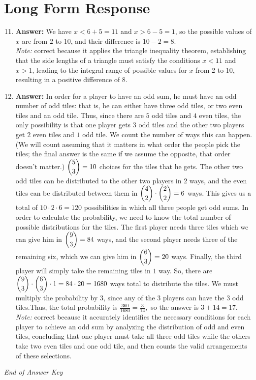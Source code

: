 \documentclass[12pt]{article}
\begin{document}
\section*{Long Form Response}
\begin{enumerate}[label=\arabic*.]
\setcounter{enumi}{10}
\item \textbf{Answer:} We have $x<6+5=11$ and $x>6-5=1$, so the possible values of $x$ are from $2$ to $10$, and their difference is $10-2 = \boxed{8}$.
\\ \textit{Note:} correct because it applies the triangle inequality theorem, establishing that the side lengths of a triangle must satisfy the conditions \( x < 11 \) and \( x > 1 \), leading to the integral range of possible values for \( x \) from 2 to 10, resulting in a positive difference of 8.
\item \textbf{Answer:} In order for a player to have an odd sum, he must have an odd number of odd tiles: that is, he can either have three odd tiles, or two even tiles and an odd tile. Thus, since there are $5$ odd tiles and $4$ even tiles, the only possibility is that one player gets $3$ odd tiles and the other two players get $2$ even tiles and $1$ odd tile. We count the number of ways this can happen. (We will count assuming that it matters in what order the people pick the tiles; the final answer is the same if we assume the opposite, that order doesn't matter.) $\dbinom{5}{3} = 10$ choices for the tiles that he gets. The other two odd tiles can be distributed to the other two players in $2$ ways, and the even tiles can be distributed between them in $\dbinom{4}{2} \cdot \dbinom{2}{2} = 6$ ways. This gives us a total of $10 \cdot 2 \cdot 6 = 120$ possibilities in which all three people get odd sums. In order to calculate the probability, we need to know the total number of possible distributions for the tiles. The first player needs three tiles which we can give him in $\dbinom{9}{3} = 84$ ways, and the second player needs three of the remaining six, which we can give him in $\dbinom{6}{3} = 20$ ways. Finally, the third player will simply take the remaining tiles in $1$ way. So, there are $\dbinom{9}{3} \cdot \dbinom{6}{3} \cdot 1 = 84 \cdot 20 = 1680$ ways total to distribute the tiles. We must multiply the probability by 3, since any of the 3 players can have the 3 odd tiles.Thus, the total probability is $\frac{360}{1680} = \frac{3}{14},$ so the answer is $3 + 14 = \boxed{17}$.
\\ \textit{Note:} correct because it accurately identifies the necessary conditions for each player to achieve an odd sum by analyzing the distribution of odd and even tiles, concluding that one player must take all three odd tiles while the others take two even tiles and one odd tile, and then counts the valid arrangements of these selections.
\end{enumerate}

\vfill
\noindent\textit{End of Answer Key}
\end{document}
